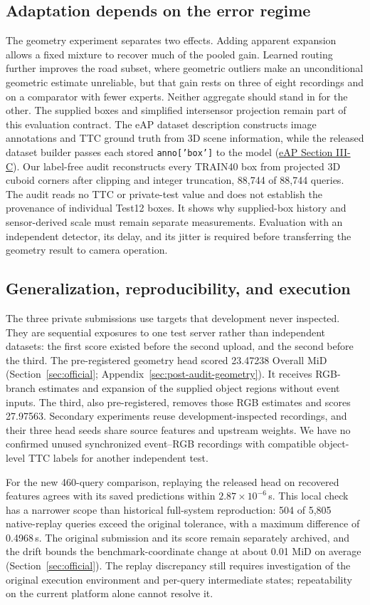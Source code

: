 \subsection{Adaptation depends on the error regime}
The geometry experiment separates two effects. Adding apparent expansion allows a fixed mixture to recover much of the pooled gain. Learned routing further improves the road subset, where geometric outliers make an unconditional geometric estimate unreliable, but that gain rests on three of eight recordings and on a comparator with fewer experts. Neither aggregate should stand in for the other. The supplied boxes and simplified intersensor projection remain part of this evaluation contract. The eAP dataset description constructs image annotations and TTC ground truth from 3D scene information, while the released dataset builder passes each stored \texttt{anno['box']} to the model (\href{https://arxiv.org/html/2603.16303v1#S3}{eAP Section III-C}). Our label-free audit reconstructs every TRAIN40 box from projected 3D cuboid corners after clipping and integer truncation, 88,744 of 88,744 queries. The audit reads no TTC or private-test value and does not establish the provenance of individual Test12 boxes. It shows why supplied-box history and sensor-derived scale must remain separate measurements. Evaluation with an independent detector, its delay, and its jitter is required before transferring the geometry result to camera operation.

\subsection{Generalization, reproducibility, and execution}
The three private submissions use targets that development never inspected. They are sequential exposures to one test server rather than independent datasets: the first score existed before the second upload, and the second before the third. The pre-registered geometry head scored 23.47238 Overall MiD (Section~\ref{sec:official}; Appendix~\ref{sec:post-audit-geometry}). It receives RGB-branch estimates and expansion of the supplied object regions without event inputs. The third, also pre-registered, removes those RGB estimates and scores 27.97563. Secondary experiments reuse development-inspected recordings, and their three head seeds share source features and upstream weights. We have no confirmed unused synchronized event--RGB recordings with compatible object-level TTC labels for another independent test.

For the new 460-query comparison, replaying the released head on recovered features agrees with its saved predictions within $2.87\times10^{-6}$\,s. This local check has a narrower scope than historical full-system reproduction: 504 of 5,805 native-replay queries exceed the original tolerance, with a maximum difference of 0.4968\,s. The original submission and its score remain separately archived, and the drift bounds the benchmark-coordinate change at about 0.01 MiD on average (Section~\ref{sec:official}). The replay discrepancy still requires investigation of the original execution environment and per-query intermediate states; repeatability on the current platform alone cannot resolve it.


